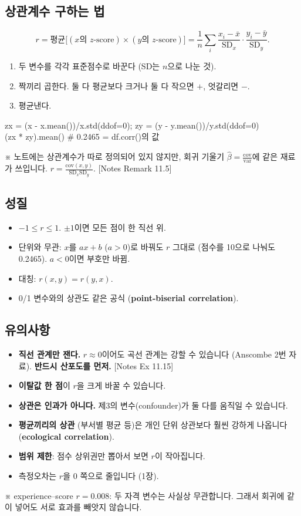 \documentclass[11pt,a4paper]{article}
\newcommand{\SD}{\mathrm{SD}}
\newcommand{\term}[1]{\textbf{#1}}
\newcommand{\nref}[1]{{\footnotesize\textsf{\color{blue!55!black}[Notes #1]}}}
\newcommand{\aside}[1]{{\footnotesize\color{black!65}#1}}
\begin{document}
\subsection{상관계수 구하는 법}
\[
r=\text{평균}\big[(x\text{의 }z\text{-score})\times(y\text{의 }z\text{-score})\big]=\frac1n\sum_i\frac{x_i-\bar x}{\SD_x}\cdot\frac{y_i-\bar y}{\SD_y}.
\]
\begin{enumerate}
\item 두 변수를 각각 표준점수로 바꾼다 (SD는 $n$으로 나눈 것).
\item 짝끼리 곱한다. 둘 다 평균보다 크거나 둘 다 작으면 $+$, 엇갈리면 $-$.
\item 평균낸다.
\end{enumerate}
\begin{codebox}
zx = (x - x.mean())/x.std(ddof=0); zy = (y - y.mean())/y.std(ddof=0)\\
(zx * zy).mean() \hfill \# 0.2465 = df.corr()의 값
\end{codebox}
\aside{※ 노트에는 상관계수가 따로 정의되어 있지 않지만, 회귀 기울기 $\hat\beta=\frac{\text{cov}}{\text{var}}$에 같은 재료가 쓰입니다. $r=\frac{\text{cov}(x,y)}{\SD_x\SD_y}$. \nref{Remark 11.5}}

\subsection{성질}
\begin{itemize}
\item $-1\le r\le1$. $\pm1$이면 모든 점이 한 직선 위.
\item 단위와 무관: $x$를 $ax+b$ ($a>0$)로 바꿔도 $r$ 그대로 (점수를 10으로 나눠도 0.2465). $a<0$이면 부호만 바뀜.
\item 대칭: $r(x,y)=r(y,x)$.
\item 0/1 변수와의 상관도 같은 공식 (\term{point-biserial correlation}).
\end{itemize}

\subsection{유의사항}
\begin{itemize}
\item \textbf{직선 관계만 잰다.} $r\approx0$이어도 곡선 관계는 강할 수 있습니다 (Anscombe 2번 자료). \textbf{반드시 산포도를 먼저.} \nref{Ex 11.15}
\item \textbf{이탈값 한 점}이 $r$을 크게 바꿀 수 있습니다.
\item \textbf{상관은 인과가 아니다.} 제3의 변수(confounder)가 둘 다를 움직일 수 있습니다.
\item \textbf{평균끼리의 상관} (부서별 평균 등)은 개인 단위 상관보다 훨씬 강하게 나옵니다 (\term{ecological correlation}).
\item \textbf{범위 제한}: 점수 상위권만 뽑아서 보면 $r$이 작아집니다.
\item 측정오차는 $r$을 0 쪽으로 줄입니다 (1장).
\end{itemize}
\aside{※ experience–score $r=0.008$: 두 자격 변수는 사실상 무관합니다. 그래서 회귀에 같이 넣어도 서로 효과를 빼앗지 않습니다.}
\end{document}
